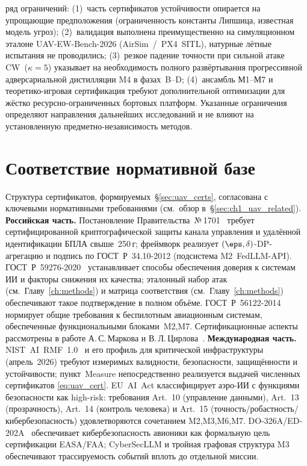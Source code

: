 ряд ограничений: (1)~часть сертификатов устойчивости опирается на
упрощающие предположения (ограниченность константы Липшица, известная
модель угроз); (2)~валидация выполнена преимущественно на симуляционном
эталоне \textsf{UAV-EW-Bench-2026} (AirSim~/~PX4~SITL), натурные лётные
испытания не проводились; (3)~резкое падение точности при сильной
атаке CW~($\kappa=5$) указывает на необходимость полного развёртывания
прогрессивной адверсариальной дистилляции \textsf{M4} в фазах~B--D;
(4)~ансамбль \textsf{М1}--\textsf{М7} и теоретико-игровая сертификация
требуют дополнительной оптимизации для жёстко ресурсно-ограниченных
бортовых платформ. Указанные ограничения определяют направления
дальнейших исследований и не влияют на установленную
предметно-независимость методов.
\section{Соответствие нормативной базе}
\label{sec:uav_regulation}
Структура сертификатов, формируемых~\S\ref{sec:uav_certs}, согласована
с ключевыми нормативными требованиями (см.\ обзор
в~\S\ref{sec:ch1_uav_related}).
\noindent\textbf{Российская часть.}
Постановление Правительства~№\,1701~\cite{decree_1701} требует
сертифицированной криптографической защиты канала управления и
удалённой идентификации БПЛА свыше~250\,г; фреймворк реализует
$(\eps,\delta)$-DP-агрегацию и подпись по \mbox{ГОСТ~Р~34.10-2012}
(подсистема \textsf{M2~FedLLM-API}).
\mbox{ГОСТ~Р~59276-2020}~\cite{GOST_R_59276_2020} устанавливает
способы обеспечения доверия к системам ИИ и факторы снижения их качества; эталонный набор атак
(см.\ Главу~\ref{ch:methods}) и матрица соответствия
(см.\ Главу~\ref{ch:methods}) обеспечивают такое подтверждение в полном объёме.
\mbox{ГОСТ~Р~56122-2014}~\cite{GOST_R_56122_2014} нормирует общие
требования к беспилотным авиационным системам, обеспеченные
функциональными блоками~\textsf{M2,M7}. Сертификационные аспекты
рассмотрены в работе А.\,С.\,Маркова и В.\,Л.\,Цирлова~\cite{Markov2023certify}.
\noindent\textbf{Международная часть.}
\mbox{NIST~AI~RMF~1.0}~\cite{nist_rmf_2023} и его профиль для
критической инфраструктуры (апрель~2026) требуют измеримых валидности,
безопасности, защищённости и устойчивости; пункт~\textsf{Measure}
непосредственно реализуется выдачей численных сертификатов
\eqref{eq:uav_cert}. \mbox{EU~AI~Act} классифицирует аэро-ИИ с
функциями безопасности как high-risk: требования Art.~10 (управление
данными), Art.~13 (прозрачность), Art.~14 (контроль человека) и
Art.~15 (точность/робастность/кибербезопасность) удовлетворяются
сочетанием \textsf{M2,M3,M6,M7}. \mbox{DO-326A/ED-202A}~\cite{do_326a_2024}
обеспечивает кибербезопасность авионики как формальную цель
сертификации EASA/FAA; \textsf{CyberSecLLM} и тройная графовая структура
\textsf{M3} обеспечивают трассируемость событий вплоть до отдельной
миссии.
